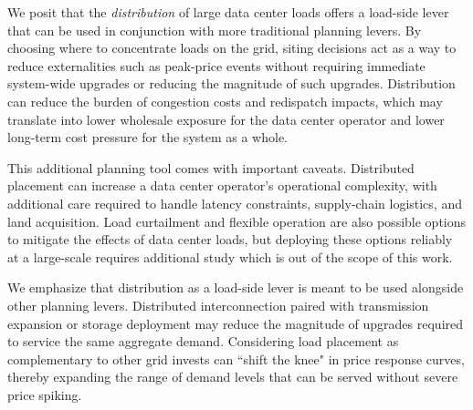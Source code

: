 We posit that the \emph{distribution} of large data center loads offers a load-side lever that can be used in conjunction with more traditional planning levers. By choosing where to concentrate loads on the grid, siting decisions act as a way to reduce externalities such as peak-price events without requiring immediate system-wide upgrades or reducing the magnitude of such upgrades. Distribution can reduce the burden of congestion costs and redispatch impacts, which may translate into lower wholesale exposure for the data center operator and lower long-term cost pressure for the system as a whole. 

This additional planning tool comes with important caveats. Distributed placement can increase a data center operator's operational complexity, with additional care required to handle latency constraints, supply-chain logistics, and land acquisition. Load curtailment and flexible operation are also possible options to mitigate the effects of data center loads, but deploying these options reliably at a large-scale requires additional study which is out of the scope of this work. 

We emphasize that distribution as a load-side lever is meant to be used alongside other planning levers. Distributed interconnection paired with transmission expansion or storage deployment may reduce the magnitude of upgrades required to service the same aggregate demand. Considering load placement as complementary to other grid invests can ``shift the knee" in price response curves, thereby expanding the range of demand levels that can be served without severe price spiking. 



